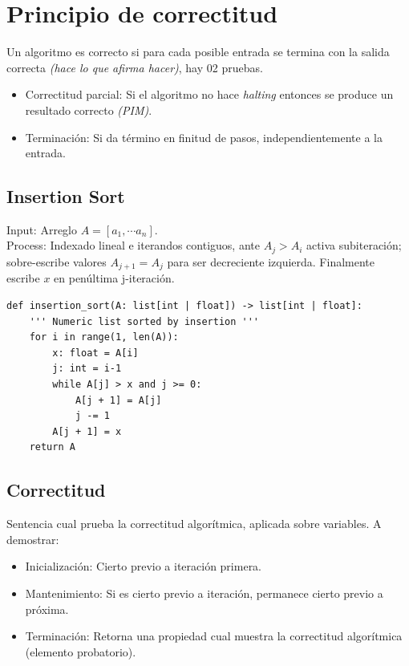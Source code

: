 \documentclass[tikz,11pt,fleqn]{book} %
\begin{document}
\section{Principio de correctitud}
Un algoritmo es correcto si para cada posible entrada se termina con la salida correcta \textit{(hace lo que afirma hacer)}, hay 02 pruebas.


\begin{itemize}
    \item{Correctitud parcial}:
    Si el algoritmo no hace \textit{halting} entonces se produce un resultado correcto \textit{(PIM)}.
    
    \item{Terminación}:
    Si da término en finitud de pasos, independientemente a la entrada.
\end{itemize}



\subsection{Insertion Sort}
Input: Arreglo  $A = [a_1, \cdots a_n]$.
\\
Process: Indexado lineal e iterandos contiguos, ante $A_j > A_i$ activa subiteración; sobre-escribe valores $A_{j+1} = A_{j}$ para ser decreciente izquierda. Finalmente escribe $x$ en penúltima j-iteración.

\begin{lstlisting}
def insertion_sort(A: list[int | float]) -> list[int | float]:
    ''' Numeric list sorted by insertion '''
    for i in range(1, len(A)):
        x: float = A[i]
        j: int = i-1
        while A[j] > x and j >= 0:
            A[j + 1] = A[j]
            j -= 1
        A[j + 1] = x
    return A
\end{lstlisting}

\subsection{Correctitud}
\begin{definition}
    Sentencia cual prueba la correctitud algorítmica, aplicada sobre variables.
    A demostrar:
    \begin{itemize}
        \item Inicialización: Cierto previo a iteración primera.
        \item Mantenimiento: Si es cierto previo a iteración, permanece cierto previo a próxima.
        \item Terminación: Retorna una propiedad cual muestra la correctitud algorítmica (elemento probatorio).
    \end{itemize}
\end{definition}
\end{document}
